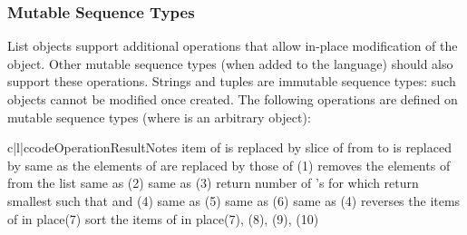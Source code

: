 \subsubsection{Mutable Sequence Types \label{typesseq-mutable}}

List objects support additional operations that allow in-place
modification of the object.
Other mutable sequence types (when added to the language) should
also support these operations.
Strings and tuples are immutable sequence types: such objects cannot
be modified once created.
The following operations are defined on mutable sequence types (where
 is an arbitrary object):

\begin{tableiii}{c|l|c}{code}{Operation}{Result}{Notes}
	{item  of  is replaced by }{}
  	{slice of  from  to  is replaced by }{}
	{same as }{}
  	{the elements of  are replaced by those of }{(1)}
	{removes the elements of  from the list}{}
	{same as }{(2)}
        {same as }{(3)}
    {return number of 's for which }{}
    {return smallest  such that  and
    }{(4)}
	{same as }{(5)}
    {same as }{(6)}
	{same as }{(4)}
	{reverses the items of  in place}{(7)}
	{sort the items of  in place}{(7), (8), (9), (10)}
\end{tableiii}
